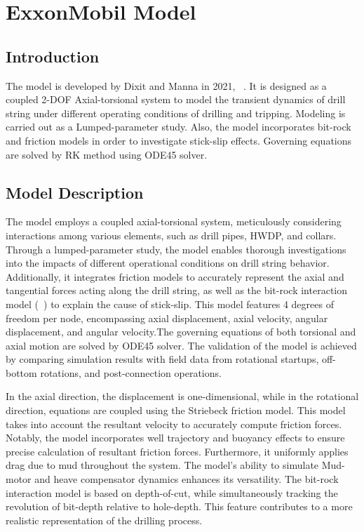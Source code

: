 \chapter{ExxonMobil Model}
\label{ch:exxonmobilmodel}

\section{Introduction}
The model is developed by Dixit and Manna in 2021, ~\cite{ref:dixit2021a}. It is designed as a coupled 2-DOF Axial-torsional system to model the transient dynamics of drill string under different operating conditions of drilling and tripping. Modeling is carried out as a Lumped-parameter study. Also, the model incorporates bit-rock and friction models in order to investigate stick-slip effects. Governing equations are solved by RK method using ODE45 solver. 

\section{Model Description}
The model employs a coupled axial-torsional system, meticulously considering interactions among various elements, such as drill pipes, HWDP, and collars. Through a lumped-parameter study, the model enables thorough investigations into the impacts of different operational conditions on drill string behavior. Additionally, it integrates friction models to accurately represent the axial and tangential forces acting along the drill string, as well as the bit-rock interaction model (~\cite{ref:cayeux2020a}) to explain the cause of stick-slip. This model features 4 degrees of freedom per node, encompassing axial displacement, axial velocity, angular displacement, and angular velocity.The governing equations of both torsional and axial motion are solved by ODE45 solver. The validation of the model is achieved by comparing simulation results with field data from rotational startups, off-bottom rotations, and post-connection operations. 

In the axial direction, the displacement is one-dimensional, while in the rotational direction, equations are coupled using the Striebeck friction model. This model takes into account the resultant velocity to accurately compute friction forces. Notably, the model incorporates well trajectory and buoyancy effects to ensure precise calculation of resultant friction forces. Furthermore, it uniformly applies drag due to mud throughout the system. The model's ability to simulate Mud-motor and heave compensator dynamics enhances its versatility. The bit-rock interaction model is based on depth-of-cut, while simultaneously tracking the revolution of bit-depth relative to hole-depth. This feature contributes to a more realistic representation of the drilling process.

